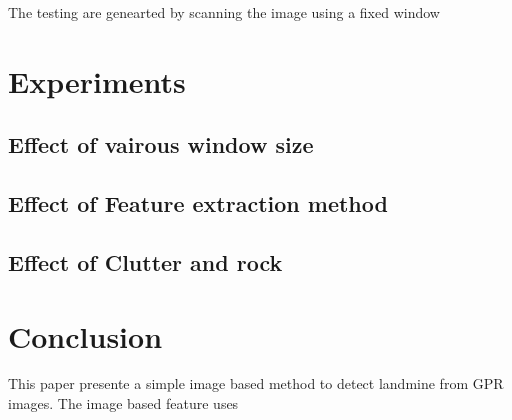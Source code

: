 \documentclass[conference]{IEEEtran}
\begin{document}
The testing are genearted by scanning the image using a fixed window

\section{Experiments}
\label{sec:results}

\subsection{Effect of vairous window size}
 \subsection{Effect of Feature extraction method}
 \subsection{Effect of Clutter and rock}

\section {Conclusion}
\label{sec:con}
This paper presente a simple image based method to detect landmine from GPR images. The image based feature uses


\end{document}
